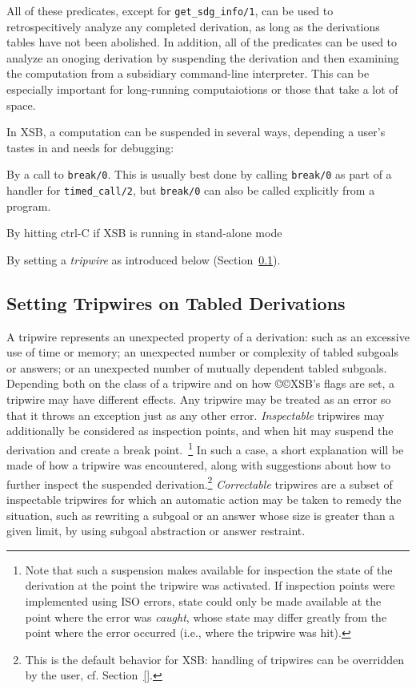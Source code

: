 All of these predicates, except for {\tt get\_sdg\_info/1}, can be
used to retrospecitively analyze any completed derivation, as long as
the derivations tables have not been abolished.  In addition, all of
the predicates can be used to analyze an onoging derivation by
suspending the derivation and then examining the computation from a
subsidiary command-line interpreter.  This can be especially important
for long-running computaiotions or those that take a lot of space.

In XSB, a computation can be suspended in several ways, depending a
user's tastes in and needs for debugging:

\bi 
\item By a call to {\tt break/0}.  This is usually best done by
  calling {\tt break/0} as part of a handler for {\tt timed\_call/2},
  but {\tt break/0} can also be called explicitly from a program.
%
\item By hitting ctrl-C if XSB is running in stand-alone mode

\item By setting a {\em tripwire} as introduced below
  (Section~\ref{sec:tripwire}).  
%
\ei

\subsection{Setting Tripwires on Tabled Derivations} \label{sec:tripwire}
%
A tripwire represents an unexpected property of a derivation: such as
an excessive use of time or memory; an unexpected number or complexity
of tabled subgoals or answers; or an unexpected number of mutually
dependent tabled subgoals.  Depending both on the class of a tripwire
and on how ©©XSB's flags are set, a tripwire may have different effects.
Any tripwire may be treated as an error so that it throws an exception
just as any other error.  {\em Inspectable} tripwires may additionally
be considered as inspection points, and when hit may suspend the
derivation and create a break point.~\footnote{Note that such a
  suspension makes available for inspection the state of the
  derivation at the point the tripwire was activated.  If inspection
  points were implemented using ISO errors, state could only be made
  available at the point where the error was {\em caught}, whose state
  may differ greatly from the point where the error occurred (i.e.,
  where the tripwire was hit).}
%
In such a case, a short explanation will be made of how a tripwire was
encountered, along with suggestions about how to further inspect the
suspended derivation.\footnote{This is the default behavior for XSB:
  handling of tripwires can be overridden by the user,
  cf. Section~\ref{}.}  {\em Correctable} tripwires are a subset of
inspectable tripwires for which an automatic action may be taken to
remedy the situation, such as rewriting a subgoal or an answer whose
size is greater than a given limit, by using subgoal abstraction or
answer restraint.

